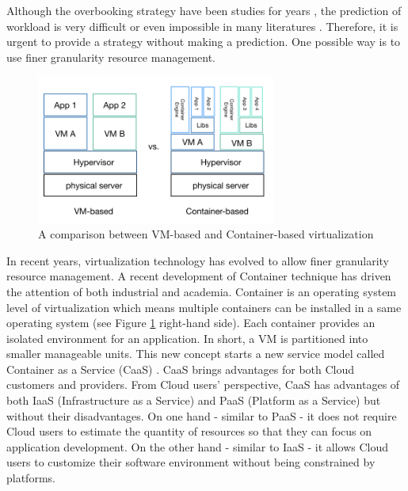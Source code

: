 
Although the overbooking strategy have been studies for years \cite{}, the prediction of workload is very difficult \cite{} or even impossible in many literatures \cite{}. Therefore, it is urgent to provide a strategy without making a prediction. One possible way is to use finer granularity resource management.

\vspace{10mm}
\begin{figure}
	\centering
	\includegraphics[width=0.7\textwidth]{pics/comparison.png}
	\caption{A comparison between VM-based and Container-based virtualization}
	\label{fig:comparison}
\end{figure}




In recent years, virtualization technology has evolved to allow finer granularity resource management.
A recent development of Container technique \cite{Soltesz:2007cu} has driven the attention of both industrial and academia.
Container is an operating system level of virtualization which means multiple containers can be installed in a same operating system (see Figure \ref{fig:comparison} right-hand side). Each container provides an isolated environment for an application. In short, a VM is partitioned into smaller manageable units.
This new concept starts a new service model called Container as a Service (CaaS) \cite{Piraghaj:2015uf}. CaaS brings advantages for both Cloud customers and providers.
From Cloud users' perspective, CaaS has advantages of both IaaS (Infrastructure as a Service) and PaaS (Platform as a Service) but without their disadvantages. On one hand - similar to PaaS - it does not require Cloud users to estimate the quantity of resources so that they can focus on application development. On the other hand - similar to IaaS - it allows Cloud users to customize their software environment without being constrained by platforms. 

